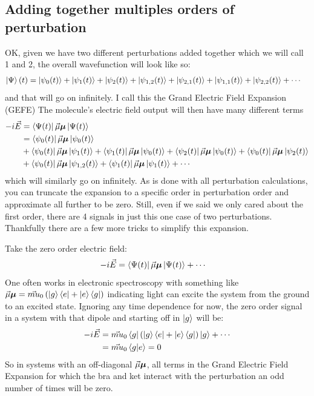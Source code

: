 \subsection{Adding together multiples orders of perturbation}
OK, given we have two different perturbations added together which we will call 1 and 2, the overall wavefunction will look like so:
\begin{align}
	\ket{\Psi}(t) &= \ket{\psi_0 (t)} + \ket{\psi_{1} (t)} + \ket{\psi_{2} (t)}+ \ket{\psi_{1, 2} (t)} + \ket{\psi_{2, 1} (t)} + \ket{\psi_{1,1} (t)}+ \ket{\psi_{2,2} (t)} + \cdots
\end{align}
and that will go on infinitely.  I call this the Grand Electric Field Expansion (GEFE)  The molecule's electric field output will then have many different terms
\begin{align*}
	-i\vec{E} &=  \bra{\Psi(t)} \vec{\mu} \boldsymbol{\mu} \ket{\Psi(t)} \\
	&= \bra{\psi_{0} (t)} \vec{\mu} \boldsymbol{\mu} \ket{\psi_{0} (t)} \\
	&+ \bra{\psi_{0} (t)} \vec{\mu} \boldsymbol{\mu} \ket{\psi_{1} (t)} + \bra{\psi_{1} (t)} \vec{\mu} \boldsymbol{\mu} \ket{\psi_{0} (t)} + \bra{\psi_{2} (t)} \vec{\mu} \boldsymbol{\mu} \ket{\psi_{0} (t)} + \bra{\psi_{0} (t)} \vec{\mu} \boldsymbol{\mu} \ket{\psi_{2} (t)} \\
	&+ \bra{\psi_{0} (t)} \vec{\mu} \boldsymbol{\mu} \ket{\psi_{1,2} (t)} +\bra{\psi_{1} (t)} \vec{\mu} \boldsymbol{\mu} \ket{\psi_{1} (t)} + \cdots
\end{align*}
which will similarly go on infinitely.  As is done with all perturbation calculations, you can truncate the expansion to a specific order in perturbation order and approximate all further to be zero.  Still, even if we said we only cared about the first order, there are 4 signals in just this one case of two perturbations. Thankfully there are a few more tricks to simplify this expansion.

Take the zero order electric field:
\begin{align*}
	-i\vec{E} &=  \bra{\Psi(t)} \vec{\mu} \boldsymbol{\mu} \ket{\Psi(t)} + \cdots
\end{align*}
One often works in electronic spectroscopy with something like $\vec{\mu} \boldsymbol{\mu} = \vec{mu}_0 \left(\ket{g}\bra{e} + \ket{e}\bra{g} \right)$ indicating light can excite the system from the ground to an excited state.  Ignoring any time dependence for now, the zero order signal in a system with that dipole and starting off in $\ket{g}$ will be:
\begin{align*}
	-i\vec{E} &=  \vec{mu}_0 \bra{g}  \left(\ket{g}\bra{e} + \ket{e}\bra{g} \right) \ket{g} + \cdots \\
	& = \vec{mu}_0 \braket{g | e} = 0
\end{align*}
So in systems with an off-diagonal $\vec{\mu} \boldsymbol{\mu}$, all terms in the Grand Electric Field Expansion for which the bra and ket interact with the perturbation an odd number of times will be zero.

